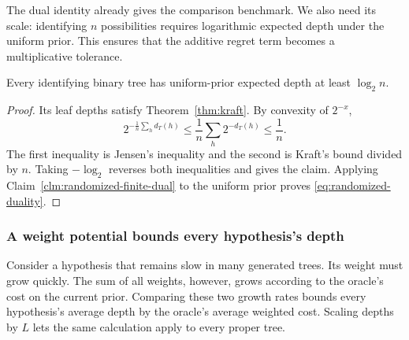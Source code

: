 The dual identity already gives the comparison benchmark. We also
need its scale: identifying $n$ possibilities requires logarithmic
expected depth under the uniform prior. This ensures that the
additive regret term becomes a multiplicative tolerance.
\begin{claim}
\label{clm:randomized-uniform-lower}
Every identifying binary tree has uniform-prior expected depth at
least $\log_2n$.
\end{claim}
\begin{proof}
Its leaf depths satisfy Theorem~\ref{thm:kraft}. By convexity of
$2^{-x}$,
\[
 2^{-\frac1n\sum_hd_T(h)}
   \le\frac1n\sum_h2^{-d_T(h)}\le\frac1n.
\]
The first inequality is Jensen's inequality and the second is Kraft's
bound divided by $n$. Taking $-\log_2$ reverses both inequalities
and gives the claim. Applying Claim~\ref{clm:randomized-finite-dual} to
the uniform prior proves \eqref{eq:randomized-duality}.
\end{proof}

\subsubsection{A weight potential bounds every hypothesis's depth}

Consider a hypothesis that remains slow in many generated trees.
Its weight must grow quickly. The sum of all weights, however,
grows according to the oracle's cost on the current prior. Comparing
these two growth rates bounds every hypothesis's average depth by
the oracle's average weighted cost. Scaling depths by $L$ lets the
same calculation apply to every proper tree.

